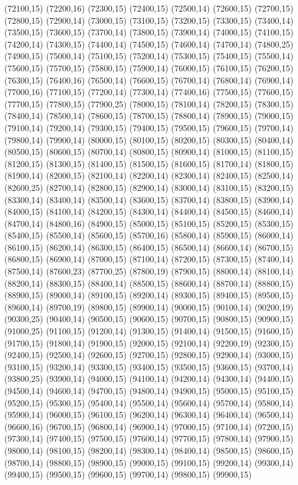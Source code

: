 (72100,15)
(72200,16)
(72300,15)
(72400,15)
(72500,14)
(72600,15)
(72700,15)
(72800,15)
(72900,14)
(73000,15)
(73100,15)
(73200,15)
(73300,15)
(73400,14)
(73500,15)
(73600,15)
(73700,14)
(73800,15)
(73900,14)
(74000,15)
(74100,15)
(74200,14)
(74300,15)
(74400,14)
(74500,15)
(74600,14)
(74700,14)
(74800,25)
(74900,15)
(75000,14)
(75100,15)
(75200,14)
(75300,15)
(75400,15)
(75500,14)
(75600,15)
(75700,15)
(75800,15)
(75900,14)
(76000,15)
(76100,15)
(76200,15)
(76300,15)
(76400,16)
(76500,14)
(76600,15)
(76700,14)
(76800,14)
(76900,14)
(77000,16)
(77100,15)
(77200,14)
(77300,14)
(77400,16)
(77500,15)
(77600,15)
(77700,15)
(77800,15)
(77900,25)
(78000,15)
(78100,14)
(78200,15)
(78300,15)
(78400,14)
(78500,14)
(78600,15)
(78700,15)
(78800,14)
(78900,15)
(79000,15)
(79100,14)
(79200,14)
(79300,15)
(79400,15)
(79500,15)
(79600,15)
(79700,14)
(79800,14)
(79900,14)
(80000,15)
(80100,15)
(80200,15)
(80300,15)
(80400,14)
(80500,15)
(80600,15)
(80700,14)
(80800,15)
(80900,14)
(81000,15)
(81100,15)
(81200,15)
(81300,15)
(81400,15)
(81500,15)
(81600,15)
(81700,14)
(81800,15)
(81900,14)
(82000,15)
(82100,14)
(82200,14)
(82300,14)
(82400,15)
(82500,14)
(82600,25)
(82700,14)
(82800,15)
(82900,14)
(83000,14)
(83100,15)
(83200,15)
(83300,14)
(83400,14)
(83500,14)
(83600,15)
(83700,14)
(83800,15)
(83900,14)
(84000,15)
(84100,14)
(84200,15)
(84300,14)
(84400,14)
(84500,15)
(84600,14)
(84700,14)
(84800,16)
(84900,15)
(85000,15)
(85100,15)
(85200,15)
(85300,15)
(85400,15)
(85500,14)
(85600,15)
(85700,16)
(85800,14)
(85900,15)
(86000,14)
(86100,15)
(86200,14)
(86300,15)
(86400,15)
(86500,14)
(86600,14)
(86700,15)
(86800,15)
(86900,14)
(87000,15)
(87100,14)
(87200,15)
(87300,15)
(87400,14)
(87500,14)
(87600,23)
(87700,25)
(87800,19)
(87900,15)
(88000,14)
(88100,14)
(88200,14)
(88300,15)
(88400,14)
(88500,15)
(88600,14)
(88700,14)
(88800,15)
(88900,15)
(89000,14)
(89100,15)
(89200,14)
(89300,15)
(89400,15)
(89500,15)
(89600,14)
(89700,19)
(89800,15)
(89900,14)
(90000,15)
(90100,14)
(90200,19)
(90300,25)
(90400,14)
(90500,15)
(90600,15)
(90700,15)
(90800,15)
(90900,15)
(91000,25)
(91100,15)
(91200,14)
(91300,15)
(91400,14)
(91500,15)
(91600,15)
(91700,15)
(91800,14)
(91900,15)
(92000,15)
(92100,14)
(92200,19)
(92300,15)
(92400,15)
(92500,14)
(92600,15)
(92700,15)
(92800,15)
(92900,14)
(93000,15)
(93100,15)
(93200,14)
(93300,15)
(93400,15)
(93500,15)
(93600,15)
(93700,14)
(93800,25)
(93900,14)
(94000,15)
(94100,14)
(94200,14)
(94300,14)
(94400,15)
(94500,14)
(94600,14)
(94700,15)
(94800,14)
(94900,15)
(95000,15)
(95100,15)
(95200,15)
(95300,15)
(95400,14)
(95500,14)
(95600,14)
(95700,14)
(95800,14)
(95900,14)
(96000,15)
(96100,15)
(96200,14)
(96300,14)
(96400,14)
(96500,14)
(96600,16)
(96700,15)
(96800,14)
(96900,14)
(97000,15)
(97100,14)
(97200,15)
(97300,14)
(97400,15)
(97500,15)
(97600,14)
(97700,15)
(97800,14)
(97900,15)
(98000,14)
(98100,15)
(98200,14)
(98300,14)
(98400,14)
(98500,15)
(98600,15)
(98700,14)
(98800,15)
(98900,15)
(99000,15)
(99100,15)
(99200,14)
(99300,14)
(99400,15)
(99500,15)
(99600,15)
(99700,14)
(99800,15)
(99900,15)
